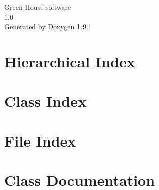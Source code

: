 \let\mypdfximage\pdfximage\def\pdfximage{\immediate\mypdfximage}\documentclass[twoside]{book}
\newcommand{\+}{\discretionary{\mbox{\scriptsize$\hookleftarrow$}}{}{}}
\newcommand{\clearemptydoublepage}{%
  \newpage{\pagestyle{empty}\cleardoublepage}%
}
\begin{document}
\raggedbottom

\hypersetup{pageanchor=false,
             bookmarksnumbered=true,
             pdfencoding=unicode
            }
\begin{titlepage}
\vspace*{7cm}
\begin{center}%
{\Large Green House software \\[1ex]\large 1.\+0 }\\
\vspace*{1cm}
{\large Generated by Doxygen 1.9.1}\\
\end{center}
\end{titlepage}
\clearemptydoublepage
{}
\tableofcontents
\clearemptydoublepage
{}
\hypersetup{pageanchor=true}

\chapter{Hierarchical Index}

\chapter{Class Index}

\chapter{File Index}

\chapter{Class Documentation}






























\end{document}
